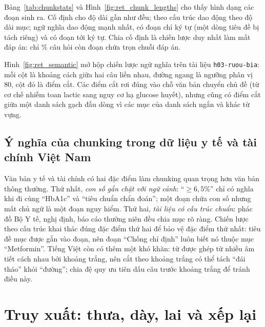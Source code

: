 Bảng~\ref{tab:chunkstats} và Hình~\ref{fig:ret_chunk_lengths} cho thấy hình dạng các đoạn sinh ra. Cố định cho độ
dài gần như đều; theo cấu trúc dao động theo độ dài mục; ngữ nghĩa dao động mạnh nhất, có đoạn chỉ
 ký tự (một dòng tiêu đề bị tách riêng) và có đoạn tới
 ký tự. Chia cố định là chiến lược duy nhất làm mất đáp án: chỉ
\% câu hỏi còn đoạn chứa trọn chuỗi đáp án.



Hình~\ref{fig:ret_semantic} mở hộp chiến lược ngữ nghĩa trên tài liệu \texttt{h03-ruou-bia}: mỗi cột là khoảng
cách giữa hai câu liền nhau, đường ngang là ngưỡng phân vị 80, cột đỏ là điểm cắt. Các điểm cắt rơi đúng vào chỗ
văn bản chuyển chủ đề (từ cơ chế nhiễm toan lactic sang nguy cơ hạ glucose huyết), nhưng cũng có điểm cắt giữa
một danh sách gạch đầu dòng vì các mục của danh sách ngắn và khác từ vựng.


\subsection{Ý nghĩa của chunking trong dữ liệu y tế và tài chính Việt Nam}
Văn bản y tế và tài chính có hai đặc điểm làm chunking quan trọng hơn văn bản thông thường. Thứ nhất, \emph{con
số gắn chặt với ngữ cảnh}: ``$\ge 6{,}5\%$'' chỉ có nghĩa khi đi cùng ``HbA1c'' và ``tiêu chuẩn chẩn đoán''; một
đoạn chứa con số nhưng mất chủ ngữ là một đoạn nguy hiểm. Thứ hai, \emph{tài liệu có cấu trúc chuẩn}: phác đồ Bộ
Y tế, nghị định, báo cáo thường niên đều chia mục rõ ràng. Chiến lược theo cấu trúc khai thác đúng đặc điểm thứ
hai để bảo vệ đặc điểm thứ nhất: tiêu đề mục được gắn vào đoạn, nên đoạn ``Chống chỉ định'' luôn biết nó thuộc
mục ``Metformin''. Tiếng Việt còn có thêm một khó khăn: từ được ghép từ nhiều âm tiết cách nhau bởi khoảng trắng,
nên cắt theo khoảng trắng có thể tách ``đái tháo'' khỏi ``đường''; chia đệ quy ưu tiên dấu câu trước khoảng trắng
để tránh điều này.

\section{Truy xuất: thưa, dày, lai và xếp lại}
